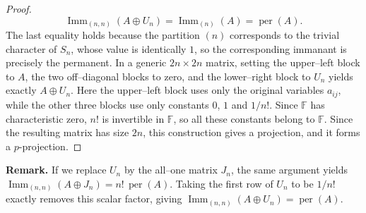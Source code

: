 \documentclass[11pt,a4paper]{article}
\begin{document}
\begin{proof}
\[  \operatorname{Imm}_{(n,n)}(A\oplus U_n)=\operatorname{Imm}_{(n)}(A)=\operatorname{per}(A).
\]
The last equality holds because the partition $(n)$ corresponds to the trivial character of $S_n$, whose value is identically $1$, so the corresponding immanant is precisely the permanent. In a generic $2n\times 2n$ matrix, setting the upper–left block to $A$, the two off–diagonal blocks to zero, and the lower–right block to $U_n$ yields exactly $A\oplus U_n$. Here the upper–left block uses only the original variables $a_{ij}$, while the other three blocks use only constants $0$, $1$ and $1/n!$. Since $\mathbb{F}$ has characteristic zero, $n!$ is invertible in $\mathbb{F}$, so all these constants belong to $\mathbb{F}$. Since the resulting matrix has size $2n$, this construction gives a projection, and it forms a $p$-projection.
\end{proof}

\noindent\textbf{Remark.}
If we replace $U_n$ by the all–one matrix $J_n$, the same argument yields
$\operatorname{Imm}_{(n,n)}(A\oplus J_n)=n!\,\operatorname{per}(A)$.
Taking the first row of $U_n$ to be $1/n!$ exactly removes this scalar factor, giving
$\operatorname{Imm}_{(n,n)}(A\oplus U_n)=\operatorname{per}(A)$.
\end{document}
